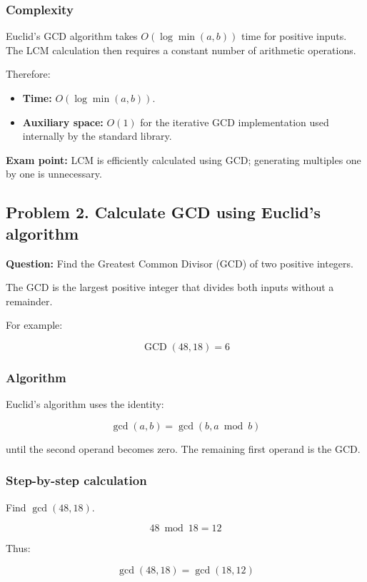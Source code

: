 \subsubsection{Complexity}

Euclid's GCD algorithm takes $O(\log\min(a,b))$ time for positive inputs. The LCM calculation then requires a constant number of arithmetic operations.

Therefore:

\begin{itemize}
    \item \textbf{Time:} $O(\log\min(a,b))$.
    \item \textbf{Auxiliary space:} $O(1)$ for the iterative GCD implementation used internally by the standard library.
\end{itemize}

\textbf{Exam point:} LCM is efficiently calculated using GCD; generating multiples one by one is unnecessary.

\subsection{Problem 2. Calculate GCD using Euclid's algorithm}

\textbf{Question:} Find the Greatest Common Divisor (GCD) of two positive integers.

The GCD is the largest positive integer that divides both inputs without a remainder.

For example:


\[
\operatorname{GCD}(48,18)=6
\]


\subsubsection{Algorithm}

Euclid's algorithm uses the identity:


\[
\boxed{\gcd(a,b)=\gcd(b,a\bmod b)}
\]


until the second operand becomes zero. The remaining first operand is the GCD.

\subsubsection{Step-by-step calculation}

Find $\gcd(48,18)$.


\[
48\bmod18=12
\]


Thus:


\[
\gcd(48,18)=\gcd(18,12)
\]


